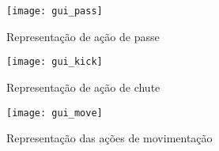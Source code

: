 \begin{figure}[h]
  \centering
  \texttt{[image: gui\_pass]}
  \caption{Representação de ação de passe}\label{fig:gui_pass}
\end{figure}

\begin{figure}[h]
  \centering
  \texttt{[image: gui\_kick]}
  \caption{Representação de ação de chute}\label{fig:gui_kick}
\end{figure}

\begin{figure}[h]
  \centering
  \texttt{[image: gui\_move]}
  \caption{Representação das ações de movimentação}\label{fig:gui_move}
\end{figure}

\FloatBarrier

